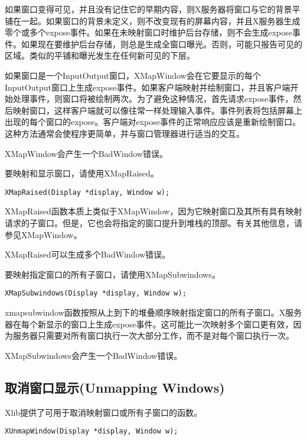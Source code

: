 如果窗口变得可见，并且没有记住它的早期内容，则X服务器将窗口与它的背景平铺在一起。如果窗口的背景未定义，则不改变现有的屏幕内容，并且X服务器生成零个或多个expose事件。如果在未映射窗口时维护后台存储，则不会生成expose事件。如果现在要维护后台存储，则总是生成全窗口曝光。否则，可能只报告可见的区域。类似的平铺和曝光发生在任何新可见的下层。

如果窗口是一个InputOutput窗口，XMapWindow会在它要显示的每个InputOutput窗口上生成expose事件。如果客户端映射并绘制窗口，并且客户端开始处理事件，则窗口将被绘制两次。为了避免这种情况，首先请求expose事件，然后映射窗口，这样客户端就可以像往常一样处理输入事件。事件列表将包括屏幕上出现的每个窗口的expose。客户端对expose事件的正常响应应该是重新绘制窗口。这种方法通常会使程序更简单，并与窗口管理器进行适当的交互。

\noindent XMapWindow会产生一个BadWindow错误。

\noindent 要映射和显示窗口，请使用XMapRaised。

\begin{lstlisting}
XMapRaised(Display *display, Window w);
\end{lstlisting}

XMapRaised函数本质上类似于XMapWindow，因为它映射窗口及其所有具有映射请求的子窗口。但是，它也会将指定的窗口提升到堆栈的顶部。有关其他信息，请参见XMapWindow。

\noindent XMapRaised可以生成多个BadWindow错误。

\noindent 要映射指定窗口的所有子窗口，请使用XMapSubwindows。

\begin{lstlisting}
XMapSubwindows(Display *display, Window w);
\end{lstlisting}

xmapsubwindow函数按照从上到下的堆叠顺序映射指定窗口的所有子窗口。X服务器在每个新显示的窗口上生成expose事件。这可能比一次映射多个窗口更有效，因为服务器只需要对所有窗口执行一次大部分工作，而不是对每个窗口执行一次。

\noindent XMapSubwindows会产生一个BadWindow错误。

\subsection{取消窗口显示(Unmapping Windows)}

\noindent Xlib提供了可用于取消映射窗口或所有子窗口的函数。

\begin{lstlisting}
XUnmapWindow(Display *display, Window w);
\end{lstlisting}

